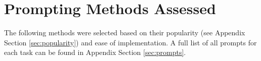 \documentclass[11pt]{article}
\begin{document}

\section*{Prompting Methods Assessed}

The following methods were selected based on their popularity (see Appendix Section \ref{sec:popularity}) and ease of implementation. A full list of all prompts for each task can be found in Appendix Section \ref{sec:prompts}.
\end{document}
